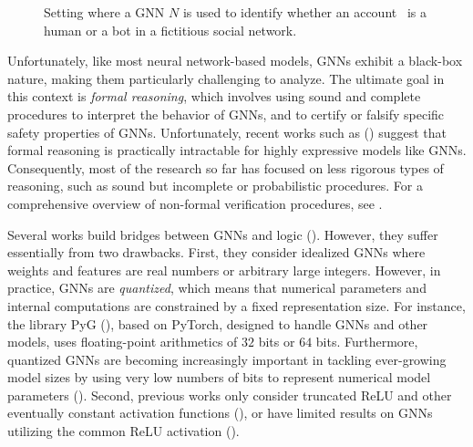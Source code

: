  \begin{figure}
     \centering
     
     \caption{Setting where a GNN $N$ is used to identify whether an account \faUser\ is a human or a bot in a fictitious social network.}
     \label{fig:gnn_social_network}
 \end{figure}

Unfortunately, like most neural network-based models, GNNs exhibit a black-box nature, making them particularly challenging to analyze. The ultimate goal in this context is \emph{formal reasoning}, which involves using sound and complete procedures to interpret the behavior of GNNs, and to certify or falsify specific safety properties of GNNs. Unfortunately, recent works such as (\citet{SalzerL23, benedikt2024decidability}) suggest that formal reasoning is practically intractable for highly expressive models like GNNs. Consequently, most of the research so far has focused on less rigorous types of reasoning, such as sound but incomplete or probabilistic procedures. For a comprehensive overview of non-formal verification procedures, see \citet{Gunnemann2022}.

Several works build bridges between GNNs and logic (\cite{DBLP:conf/iclr/BarceloKM0RS20, benedikt2024decidability, ijcai2024}). However, they suffer essentially from two drawbacks. First, they consider idealized GNNs where weights and features are real numbers or arbitrary large integers. However, in practice, GNNs are \emph{quantized}, which means that numerical parameters and internal computations are constrained by a fixed representation size. For instance, the library \textsf{PyG} (\cite{Fey/Lenssen/2019}), based on PyTorch, designed to handle GNNs and other models, uses floating-point arithmetics of $32$ bits or $64$ bits. Furthermore, quantized GNNs are becoming increasingly important in tackling ever-growing model sizes by using very low numbers of bits to represent numerical model parameters (\cite{GholamiQuantized,ZhuLMH0LL023}). Second, previous works only consider truncated ReLU and other eventually constant activation functions (\cite{DBLP:conf/iclr/BarceloKM0RS20, ijcai2024}), or have limited results on GNNs utilizing the common ReLU activation (\cite{benedikt2024decidability}).

